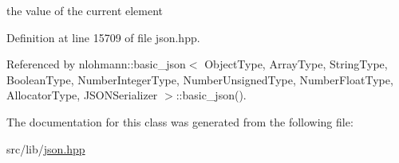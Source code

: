 the value of the current element 



Definition at line 15709 of file json.\+hpp.



Referenced by nlohmann\+::basic\+\_\+json$<$ Object\+Type, Array\+Type, String\+Type, Boolean\+Type, Number\+Integer\+Type, Number\+Unsigned\+Type, Number\+Float\+Type, Allocator\+Type, J\+S\+O\+N\+Serializer $>$\+::basic\+\_\+json().



The documentation for this class was generated from the following file\+:\begin{DoxyCompactItemize}
\item 
src/lib/\hyperlink{json_8hpp}{json.\+hpp}\end{DoxyCompactItemize}

